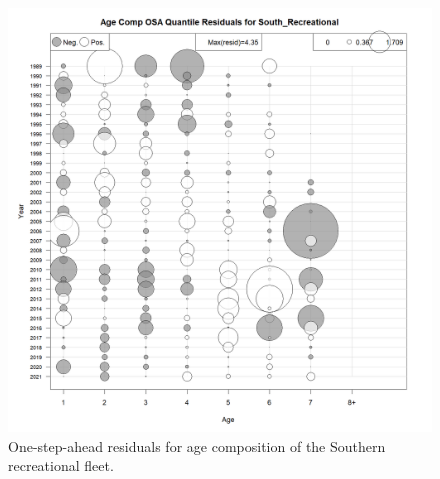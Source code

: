 \documentclass[
]{article}
\begin{document}
\begin{figure}

{\centering \includegraphics[width=1\linewidth]{../2023.RT.Runs/Run34/plots_png/diagnostics/Catch_age_comp_osa_resids_South_Recreational} 

}

\caption{One-step-ahead residuals for age composition of the Southern recreational fleet.}\label{fig:osa-South-rec-paa}
\end{figure}
\end{document}
